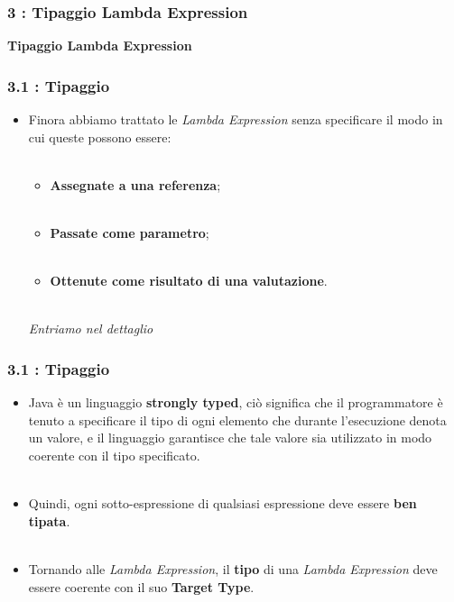 \documentclass{beamer}
\begin{document}

\begin{frame}
	\frametitle{\textbf{3 : Tipaggio Lambda Expression}}
	\begin{center}
		\textbf{\Huge Tipaggio Lambda Expression}
	\end{center}
\end{frame}


\begin{frame}
	\frametitle{\textbf{3.1 : Tipaggio}}
	\begin{itemize}
		\item 
			Finora abbiamo trattato le \textit{Lambda Expression} senza specificare il modo in cui queste possono essere:\\\ 
			\begin{itemize}
				\item
					\textbf{Assegnate a una referenza};\\\
				\item
					\textbf{Passate come parametro};\\\
				\item
					\textbf{Ottenute come risultato di una valutazione}.\\\	
			\end{itemize}
			\textit{Entriamo nel dettaglio}
	\end{itemize}
\end{frame}


\begin{frame}
	\frametitle{\textbf{3.1 : Tipaggio}}
	\begin{itemize}
		\item 
			Java è un linguaggio \textbf{strongly typed}, ciò significa che il programmatore è tenuto a specificare il tipo di ogni elemento che durante l'esecuzione denota un valore, e il linguaggio garantisce che tale valore sia utilizzato in modo coerente con il tipo specificato.\\\
		\item 
			Quindi, ogni sotto-espressione di qualsiasi espressione deve essere \textbf{ben tipata}.\\\
		\item 
			Tornando alle \textit{Lambda Expression}, il \textbf{tipo} di una \textit{Lambda Expression} deve essere coerente con il suo \textbf{Target Type}.
	\end{itemize}
\end{frame}
\end{document}
